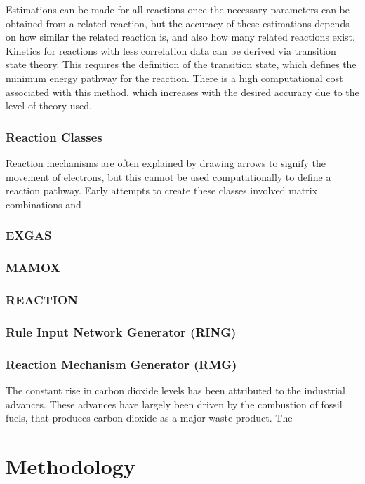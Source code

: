 \documentclass[12pt]{article}
\begin{document}
Estimations can be made for all reactions once the necessary parameters can be obtained from a related reaction, but the accuracy of these estimations depends on how similar the related reaction is, and also how many related reactions exist. Kinetics for reactions with less correlation data can be derived via transition state theory. This requires the definition of the transition state, which defines the minimum energy pathway for the reaction. There is a high computational cost associated with this method, which increases with the desired accuracy due to the level of theory used.

\subsubsection{Reaction Classes}
Reaction mechanisms are often explained by drawing arrows to signify the movement of electrons, but this cannot be used computationally to define a reaction pathway. Early attempts to create these classes involved matrix combinations and 

\subsubsection{EXGAS}
\subsubsection{MAMOX}
\subsubsection{REACTION}
\subsubsection{Rule Input Network Generator (RING)}
\subsubsection{Reaction Mechanism Generator (RMG)}

The constant rise in carbon dioxide levels has been attributed to the industrial advances. These advances have largely been driven by the combustion of fossil fuels, that produces carbon dioxide as a major waste product. The 

\section{Methodology}
\end{document}
